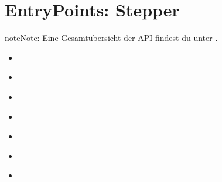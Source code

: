 \documentclass[letterpaper,10pt,english]{sphinxmanual}
\begin{document}
\sphinxstepscope


\chapter{Entry\sphinxhyphen{}Points: Stepper}
\label{\detokenize{agv_rest_api_stepper:entry-points-stepper}}\label{\detokenize{agv_rest_api_stepper::doc}}
\begin{sphinxadmonition}{note}{Note:}
\sphinxAtStartPar
Eine Gesamtübersicht der API findest du unter {\hyperref[\detokenize{index::doc}]{}}.
\end{sphinxadmonition}

\sphinxAtStartPar
{}
\begin{itemize}
\item {} 
\sphinxAtStartPar
{\hyperref[\detokenize{agv_rest_api_stepper:post-api-agv-stepper-setvelocity}]{}}

\item {} 
\sphinxAtStartPar
{\hyperref[\detokenize{agv_rest_api_stepper:post-api-agv-stepper-enable}]{}}

\item {} 
\sphinxAtStartPar
{\hyperref[\detokenize{agv_rest_api_stepper:get-api-agv-stepper-ismoving}]{}}

\item {} 
\sphinxAtStartPar
{\hyperref[\detokenize{agv_rest_api_stepper:get-api-agv-stepper-motionmode}]{}}

\item {} 
\sphinxAtStartPar
{\hyperref[\detokenize{agv_rest_api_stepper:post-api-agv-stepper-abortmotion}]{}}

\item {} 
\sphinxAtStartPar
{\hyperref[\detokenize{agv_rest_api_stepper:post-api-agv-stepper-resetposition}]{}}

\item {} 
\sphinxAtStartPar
{\hyperref[\detokenize{agv_rest_api_stepper:get-api-agv-stepper-getcurrentvelocity}]{}}


\end{itemize}
\end{document}
